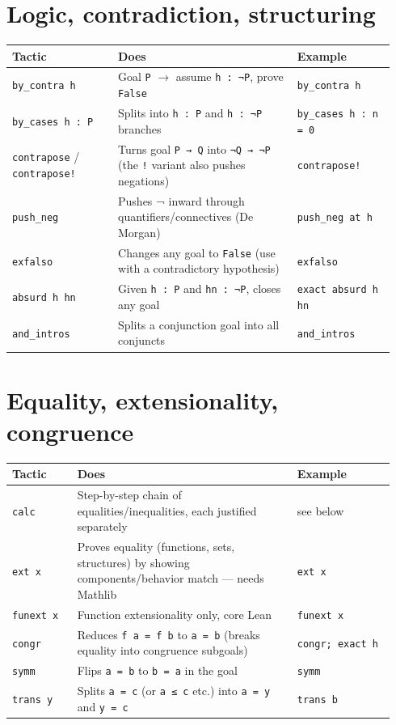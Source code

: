\section{Logic, contradiction, structuring}

\begin{center}
\begin{tabular}{@{}p{0.26\linewidth}p{0.44\linewidth}p{0.24\linewidth}@{}}
\hline
\textbf{Tactic} & \textbf{Does} & \textbf{Example} \\
\hline
\texttt{by\_contra h} & Goal \texttt{P} $\rightarrow$ assume \texttt{h : ¬P}, prove \texttt{False} & \texttt{by\_contra h} \\
\texttt{by\_cases h : P} & Splits into \texttt{h : P} and \texttt{h : ¬P} branches & \texttt{by\_cases h : n = 0} \\
\texttt{contrapose} / \texttt{contrapose!} & Turns goal \texttt{P → Q} into \texttt{¬Q → ¬P} (the \texttt{!} variant also pushes negations) & \texttt{contrapose!} \\
\texttt{push\_neg} & Pushes ¬ inward through quantifiers/connectives (De Morgan) & \texttt{push\_neg at h} \\
\texttt{exfalso} & Changes any goal to \texttt{False} (use with a contradictory hypothesis) & \texttt{exfalso} \\
\texttt{absurd h hn} & Given \texttt{h : P} and \texttt{hn : ¬P}, closes any goal & \texttt{exact absurd h hn} \\
\texttt{and\_intros} & Splits a conjunction goal into all conjuncts & \texttt{and\_intros} \\
\hline
\end{tabular}
\end{center}

\section{Equality, extensionality, congruence}

\begin{center}
\begin{tabular}{@{}p{0.16\linewidth}p{0.54\linewidth}p{0.24\linewidth}@{}}
\hline
\textbf{Tactic} & \textbf{Does} & \textbf{Example} \\
\hline
\texttt{calc} & Step-by-step chain of equalities/inequalities, each justified separately & see below \\
\texttt{ext x} & Proves equality (functions, sets, structures) by showing components/behavior match --- needs Mathlib & \texttt{ext x} \\
\texttt{funext x} & Function extensionality only, core Lean & \texttt{funext x} \\
\texttt{congr} & Reduces \texttt{f a = f b} to \texttt{a = b} (breaks equality into congruence subgoals) & \texttt{congr; exact h} \\
\texttt{symm} & Flips \texttt{a = b} to \texttt{b = a} in the goal & \texttt{symm} \\
\texttt{trans y} & Splits \texttt{a = c} (or \texttt{a ≤ c} etc.) into \texttt{a = y} and \texttt{y = c} & \texttt{trans b} \\
\hline
\end{tabular}
\end{center}


